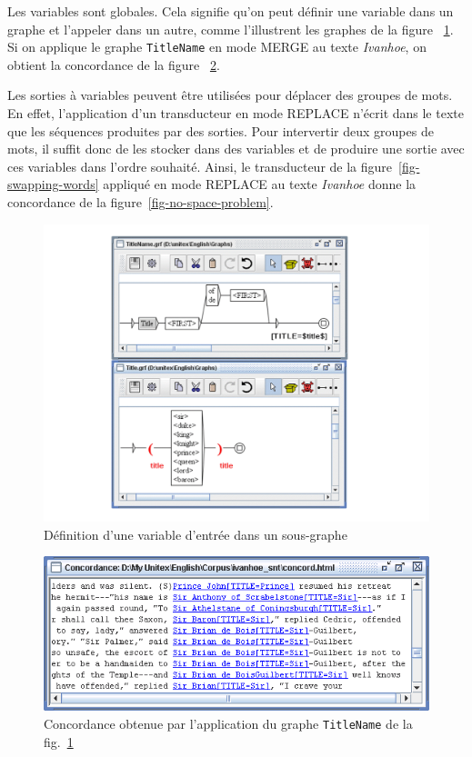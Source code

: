 \bigskip
\noindent Les variables sont globales. Cela signifie qu'on peut définir une variable dans un
graphe et l’appeler dans un autre, comme l’illustrent les graphes de la figure
~\ref{fig-variable-definition}. Si on applique le graphe \verb+TitleName+ en mode MERGE au texte
\textit{Ivanhoe}, on obtient la concordance de la figure ~\ref{fig6-14}.

\bigskip
\noindent Les sorties à variables peuvent être utilisées pour déplacer des groupes de
mots. En effet,
l’application d’un transducteur en mode REPLACE n’écrit dans le texte que les séquences
produites par des sorties. Pour intervertir deux groupes de mots, il suffit donc de les stocker
dans des variables et de produire une sortie avec ces variables dans l’ordre souhaité. Ainsi,
le transducteur de la
figure~\ref{fig-swapping-words} appliqué en mode REPLACE au texte \textit{Ivanhoe}
donne la concordance de la figure~\ref{fig-no-space-problem}.

\begin{figure}[!htp]
\begin{center}
\includegraphics[width=16cm]{resources/img/fig6-25.pdf}
\caption{Définition d’une variable d'entrée dans un sous-graphe\label{fig-variable-definition}}
\end{center}
\end{figure}

\begin{figure}[!htp]
\begin{center}
\includegraphics[width=13cm]{resources/img/fig6-26.png}
\caption{Concordance obtenue par l’application du graphe \texttt{TitleName}\label{fig6-14}
de la fig.~\ref{fig-variable-definition}
}
\end{center}
\end{figure}

